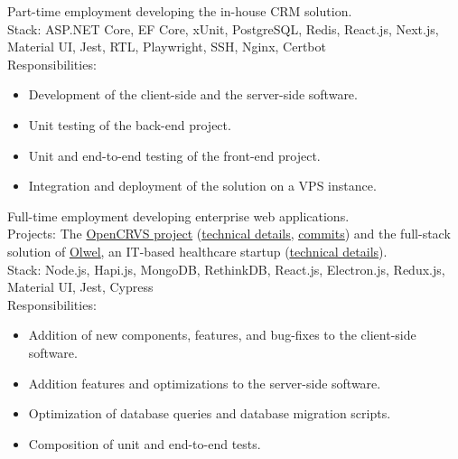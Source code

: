 \documentclass[10pt,a4paper,ragged2e]{altacv}
\begin{document}
\small Part-time employment developing the in-house CRM solution.\\
\smallskip
Stack: ASP.NET Core, EF Core, xUnit, PostgreSQL, Redis, React.js, Next.js, Material UI, Jest, RTL, Playwright, SSH, Nginx, Certbot\\
\smallskip
Responsibilities:
\begin{itemize}
\item Development of the client-side and the server-side software.
\item Unit testing of the back-end project.
\item Unit and end-to-end testing of the front-end project.
\item Integration and deployment of the solution on a VPS instance.
\end{itemize}

\medskip

\small Full-time employment developing enterprise web applications.\\
\smallskip
\small Projects: The \href{https://www.dsinnovators.com/projects/open-crvs}{OpenCRVS project} (\href{https://www.dsinnovators.com/casestudies/open-crvs-2}{\underline{technical details}}, \href{https://github.com/opencrvs/opencrvs-core/commits?author=maacpiash}{\underline{commits}}) and the full-stack solution of \href{https://www.dsinnovators.com/projects/olwel}{\underline{Olwel}}, an IT-based healthcare startup (\href{https://www.dsinnovators.com/casestudies/olwel-2}{\underline{technical details}}).\\
\smallskip
Stack: Node.js, Hapi.js, MongoDB, RethinkDB, React.js, Electron.js, Redux.js, Material UI, Jest, Cypress\\
\smallskip
Responsibilities:
\begin{itemize}
\item Addition of new components, features, and bug-fixes to the client-side software.
\item Addition features and optimizations to the server-side software.
\item Optimization of database queries and database migration scripts.
\item Composition of unit and end-to-end tests.
\end{itemize}
\end{document}
